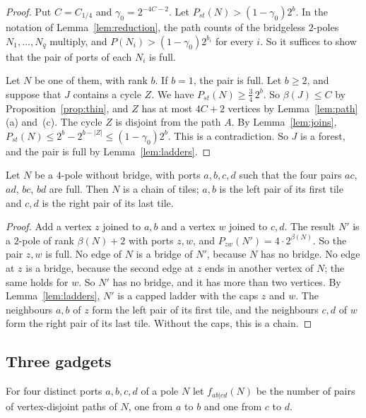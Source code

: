 \begin{proof}
Put $C=C_{1/4}$ and $\gamma_0=2^{-4C-2}$. Let $P_{st}(N)>(1-\gamma_0)2^{b}$. In the notation of
Lemma~\ref{lem:reduction}, the path counts of the bridgeless $2$-poles $N_1,\dots,N_q$ multiply,
and $P(N_i)>(1-\gamma_0)2^{b_i}$ for every $i$. So it suffices to show that the pair of ports of
each $N_i$ is full.

Let $N$ be one of them, with rank $b$. If $b=1$, the pair is full. Let $b\ge2$, and suppose that
$J$ contains a cycle $Z$. We have $P_{st}(N)\ge\frac34\,2^{b}$. So $\beta(J)\le C$ by
Proposition~\ref{prop:thin}, and $Z$ has at most $4C+2$ vertices by Lemma~\ref{lem:path}(a)
and~(c). The cycle $Z$ is disjoint from the path $A$. By Lemma~\ref{lem:joins},
$P_{st}(N)\le2^{b}-2^{b-|Z|}\le(1-\gamma_0)2^{b}$. This is a contradiction. So $J$ is a forest,
and the pair is full by Lemma~\ref{lem:ladders}.
\end{proof}

\begin{corollary}\label{cor:fourports}
Let $N$ be a $4$-pole without bridge, with ports $a,b,c,d$ such that the four pairs $ac$, $ad$,
$bc$, $bd$ are full. Then $N$ is a chain of tiles; $a,b$ is the left pair of its first tile and
$c,d$ is the right pair of its last tile.
\end{corollary}

\begin{proof}
Add a vertex $z$ joined to $a,b$ and a vertex $w$ joined to $c,d$. The result $N'$ is a $2$-pole
of rank $\beta(N)+2$ with ports $z,w$, and $P_{zw}(N')=4\cdot2^{\beta(N)}$. So the pair $z,w$ is
full. No edge of $N$ is a bridge of $N'$, because $N$ has no bridge. No edge at $z$ is a bridge,
because the second edge at $z$ ends in another vertex of $N$; the same holds for $w$. So $N'$ has
no bridge, and it has more than two vertices. By Lemma~\ref{lem:ladders}, $N'$ is a capped ladder
with the caps $z$ and $w$. The neighbours $a,b$ of $z$ form the left pair of
its first tile, and the neighbours $c,d$ of $w$ form the right pair of its last tile. Without the
caps, this is a chain.
\end{proof}

\subsection{Three gadgets}\label{sec:gadgets}

For four distinct ports $a,b,c,d$ of a pole $N$ let $f_{ab|cd}(N)$ be the number of pairs of
vertex-disjoint paths of $N$, one from $a$ to $b$ and one from $c$ to $d$.

